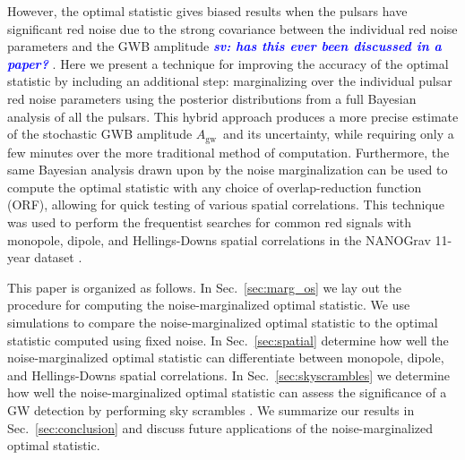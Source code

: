 \documentclass[twocolumn,aps,prd,superscriptaddress]{revtex4-1}
\newcommand{\sv}[1]{\textcolor{blue}{\it{\textbf{sv: #1}}} }
\newcommand{\Agw}{\ensuremath{A_\mathrm{gw}}}
\begin{document}
However, the optimal statistic gives biased results 
when the pulsars have significant red noise 
due to the strong covariance between the individual red noise parameters 
and the GWB amplitude \sv{has this ever been discussed in a paper?}. 
Here we present a technique for improving the accuracy of the optimal statistic by including an additional step: 
marginalizing over the individual pulsar red noise parameters 
using the posterior distributions from a full Bayesian analysis of all the pulsars. 
This hybrid approach produces a more precise estimate of the stochastic GWB amplitude \Agw\ 
and its uncertainty, while requiring only a few minutes over the more traditional method of computation. 
Furthermore, the same Bayesian analysis drawn upon by the noise marginalization 
can be used to compute the optimal statistic with any choice of overlap-reduction function (ORF), 
allowing for quick testing of various spatial correlations. 
This technique was used to perform the frequentist searches 
for common red signals with monopole, dipole, and Hellings-Downs spatial correlations 
in the NANOGrav 11-year dataset \citep{abb+17b}.

This paper is organized as follows. In Sec.~\ref{sec:marg_os} 
we lay out the procedure for computing the noise-marginalized optimal statistic. 
We use simulations to compare the noise-marginalized optimal statistic 
to the optimal statistic computed using fixed noise. 
In Sec.~\ref{sec:spatial} determine how well 
the noise-marginalized optimal statistic can 
differentiate between monopole, dipole, and Hellings-Downs spatial correlations. 
In Sec.~\ref{sec:skyscrambles} we determine how well the noise-marginalized optimal statistic 
can assess the significance of a GW detection by performing sky scrambles \citep{cs2016}. 
We summarize our results in Sec.~\ref{sec:conclusion} 
and discuss future applications of the noise-marginalized optimal statistic.
\end{document}
